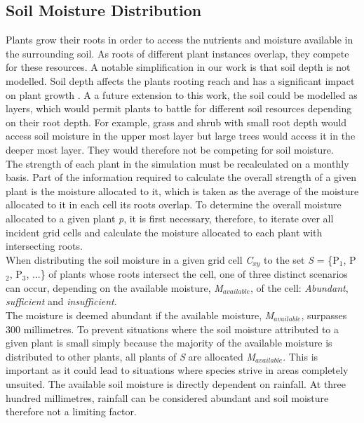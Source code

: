 \subsection{Soil Moisture Distribution} \label{subsec:humidity_distribution}

Plants grow their roots in order to access the nutrients and moisture available in the surrounding soil. As roots of different plant instances overlap, they compete for these resources. A notable simplification in our work is that soil depth is not modelled. Soil depth affects the plants rooting reach and has a significant impact on plant growth \cite{Fourcaud2008}. A a future extension to this work, the soil could be modelled as layers, which would permit plants to battle for different soil resources depending on their root depth. For example, grass and shrub with small root depth would access soil moisture in the upper most layer but large trees would access it in the deeper most layer. They would therefore not be competing for soil moisture. \\

The strength of each plant in the simulation must be recalculated on a monthly basis. Part of the information required to calculate the overall strength of a given plant is the moisture allocated to it, which is taken as the average of the moisture allocated to it in each cell its roots overlap. To determine the overall moisture allocated to a given plant \textit{p}, it is first necessary, therefore, to iterate over all incident grid cells and calculate the moisture allocated to each plant with intersecting roots.\\

When distributing the soil moisture in a given grid cell \textit{C$_{xy}$} to the set \textit{S} = \{P$_{1}$, P$_{2}$, P$_{3}$, ...\} of plants whose roots intersect the cell, one of three distinct scenarios can occur, depending on the available moisture, \textit{M$_{available}$}, of the cell: \textit{Abundant}, \textit{sufficient} and \textit{insufficient}.\\

The moisture is deemed abundant if the available moisture, \textit{M$_{available}$}, surpasses 300 millimetres. To prevent situations where the soil moisture attributed to a given plant is small simply because the majority of the available moisture is distributed to other plants, all plants of \textit{S} are allocated \textit{M$_{available}$}. This is important as it could lead to situations where species strive in areas completely unsuited. The available soil moisture is directly dependent on rainfall. At three hundred millimetres, rainfall can be considered abundant and soil moisture therefore not a limiting factor. \\

